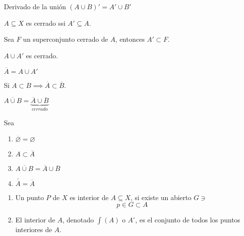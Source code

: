 \begin{prop}
    Derivado de la unión $(A\cup B)'=A'\cup B' $
    
\end{prop}

\begin{prop}
    $A\subseteq X$ es cerrado ssi $A'\subseteq A$.
\end{prop}

\begin{prop}
    Sea $F$ un superconjunto cerrado de $A$, entonces $A'\subset F$. 
\end{prop}

\begin{prop}
    $A\cup A'$ es cerrado.
\end{prop}


\begin{prop}
    $\overline{A}=A\cup A'$

\end{prop}


\begin{prop}
    Si $A\subset B\implies \overline{A}\subset \overline{B}$.
    
\end{prop}

\begin{prop}
    $\overline{A\cup B}=\underbrace{\overline{A}\cup \overline{B}}_{cerrado}$
\end{prop}

\begin{teorema}
    Sea \begin{enumerate}
        \item $\overline{\varnothing}=\varnothing$
        \item $A\subset \overline{A}$
        \item $\overline{A\cup B}=\overline{A}\cup \overline{B}$
        \item $\overline{\overline{A}}=\overline{A}$
    \end{enumerate}

\end{teorema}

\begin{definicion}
    \begin{enumerate}
        \item Un punto $P$ de $X$ es interior de $A\subseteq X$, si existe un abierto $G\ni$
        $$p\in G\subset A$$
        \item El interior de $A$, denotado $\int(A)$ o $A^{\circ}$, es el conjunto de todos los puntos interiores de $A$. 
    \end{enumerate}
    
\end{definicion}

